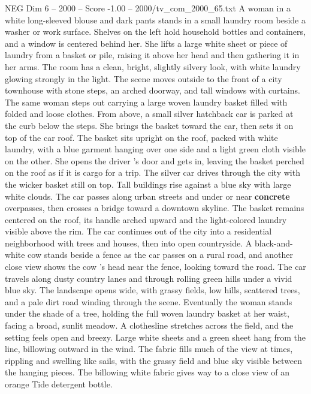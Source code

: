 \begin{textsample}{NEG Dim 6 – 2000 – Score -1.00 – 2000/tv\_com\_2000\_65.txt}  \label{ex:f6_neg_048}
A woman in a white long-sleeved blouse and dark pants stands in a small laundry room beside a washer or work surface.
Shelves on the left hold household bottles and containers, and a window is centered behind her.
She lifts a large white sheet or piece of laundry from a basket or pile, raising it above her head and then gathering it in her arms.
The room has a clean, bright, slightly silvery look, with white laundry glowing strongly in the light.
The scene moves outside to the front of a city townhouse with stone steps, an arched doorway, and tall windows with curtains.
The same woman steps out carrying a large woven laundry basket filled with folded and loose clothes.
From above, a small silver hatchback car is parked at the curb below the steps.
She brings the basket toward the car, then sets it on top of the car roof.
The basket sits upright on the roof, packed with white laundry, with a blue garment hanging over one side and a light green cloth visible on the other.
She opens the driver ’s door and gets in, leaving the basket perched on the roof as if it is cargo for a trip.
The silver car drives through the city with the wicker basket still on top.
Tall buildings rise against a blue sky with large white clouds.
The car passes along urban streets and under or near \textbf{concrete} overpasses, then crosses a bridge toward a downtown skyline.
The basket remains centered on the roof, its handle arched upward and the light-colored laundry visible above the rim.
The car continues out of the city into a residential neighborhood with trees and houses, then into open countryside.
A black-and-white cow stands beside a fence as the car passes on a rural road, and another close view shows the cow ’s head near the fence, looking toward the road.
The car travels along dusty country lanes and through rolling green hills under a vivid blue sky.
The landscape opens wide, with grassy fields, low hills, scattered trees, and a pale dirt road winding through the scene.
Eventually the woman stands under the shade of a tree, holding the full woven laundry basket at her waist, facing a broad, sunlit meadow.
A clothesline stretches across the field, and the setting feels open and breezy.
Large white sheets and a green sheet hang from the line, billowing outward in the wind.
The fabric fills much of the view at times, rippling and swelling like sails, with the grassy field and blue sky visible between the hanging pieces.
The billowing white fabric gives way to a close view of an orange Tide detergent bottle.

\end{textsample}
